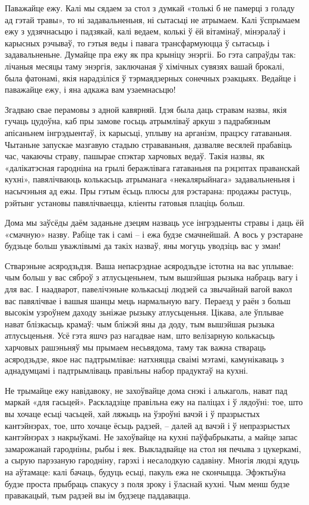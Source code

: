 Паважайце ежу. Калі мы сядаем за стол з думкай «толькі б не памерці з голаду ад гэтай травы», то ні задавальненьня, ні сытасьці не атрымаем. Калі ўспрымаем ежу з удзячнасьцю і падзякай, калі ведаем, колькі ў ёй вітамінаў, мінэралаў і карысных рэчываў, то гэтыя веды і павага трансфармуюцца ў сытасьць і задавальненьне. Думайце пра ежу як пра крыніцу энэргіі. Бо гэта сапраўды так: лічаныя месяцы таму энэргія, заключаная ў хімічных сувязях вашай брокалі, была фатонамі, якія нарадзіліся ў тэрмаядзерных сонечных рэакцыях. Ведайце і паважайце ежу, і яна адкажа вам узаемнасьцю!

Згадваю свае перамовы з адной кавярняй. Ідэя была даць стравам назвы, якія гучаць цудоўна, каб пры замове госьць атрымліваў аркуш з падрабязным апісаньнем інгрэдыентаў, іх карысьці, уплыву на арганізм, працэсу гатаваньня. Чытаньне запускае мазгавую стадыю страваваньня, дазваляе весялей прабавіць час, чакаючы страву, пашырае спэктар харчовых ведаў. Такія назвы, як «далікатэсная гародніна на грылі беражлівага гатаваньня па рэцэптах праванскай кухні», павялічваюць колькасьць атрыманага «некалярыйнага» задавальненьня і насычэньня ад ежы. Пры гэтым ёсьць плюсы для рэстарана: продажы растуць, рэйтынг установы павялічваецца, кліенты гатовыя плаціць больш.

Дома мы заўсёды даём заданьне дзецям назваць усе інгрэдыенты стравы і даць ёй «смачную» назву. Рабіце так і самі – і ежа будзе смачнейшай. А вось у рэстаране будзьце больш уважлівымі да такіх назваў, яны могуць уводзіць вас у зман!

Стварэньне асяродзьдзя. Ваша непасрэднае асяродзьдзе істотна на вас уплывае: чым больш у вас сяброў з атлусьценьнем, тым вышэйшая рызыка набраць вагу і для вас. І наадварот, павелічэньне колькасьці людзей са звычайнай вагой вакол вас павялічвае і вашыя шанцы мець нармальную вагу. Пераезд у раён з больш высокім узроўнем даходу зьніжае рызыку атлусьценьня. Цікава, але ўплывае нават блізкасьць крамаў: чым бліжэй яны да доду, тым вышэйшая рызыка атлусьценьня. Усё гэта яшчэ раз нагадвае нам, што велізарную колькасьць харчовых рашэньняў мы прымаем несьвядома, таму так важна ствараць асяродзьдзе, якое нас падтрымлівае: натхняцца сваімі мэтамі, камунікаваць з аднадумцамі і падтрымліваць правільны набор прадуктаў на кухні.

Не трымайце ежу навідавоку, не захоўвайце дома снэкі і алькаголь, нават пад маркай «для гасьцей». Раскладзіце правільна ежу на паліцах і ў лядоўні: тое, што вы хочаце есьці часьцей, хай ляжыць на ўзроўні вачэй і ў празрыстых кантэйнэрах, тое, што хочаце ёсьць радзей, – далей ад вачэй і ў непразрыстых кантэйнэрах з накрыўкамі. Не захоўвайце на кухні паўфабрыкаты, а майце запас замарожанай гародніны, рыбы і яек. Выкладвайце на стол ня печыва з цукеркамі, а сырую парэзаную гародніну, гарэхі і несалодкую садавіну. Многія людзі ядуць на аўтамаце: калі бачаць, будуць есьці, пакуль ежа не скончыцца. Эфэктыўна будзе проста прыбраць спакусу з поля зроку і ўласнай кухні. Чым менш будзе правакацый, тым радзей вы ім будзеце паддавацца.

